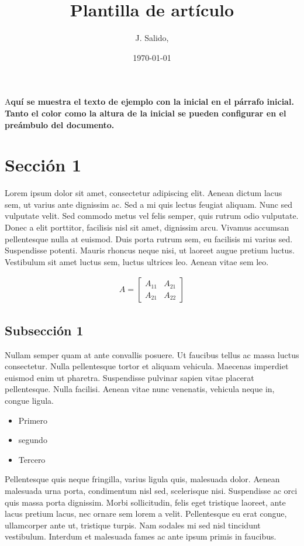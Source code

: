\documentclass[DIV=calc,paper=a4,fontsize=11pt,twocolumn]{scrartcl} %
\title{Plantilla de artículo}
\author{J. Salido, }
\date{\today} %
\newcommand{\inicial}[1]{ %
\lettrine[lines=3,lhang=0.3,nindent=0em]{
\color{DarkGoldenrod}
{\textsf{#1}}}{}}
\begin{document}
\maketitle

\thispagestyle{fancy}

%
%
\inicial{A}\textbf{quí se muestra el texto de ejemplo con la inicial en el párrafo inicial. Tanto el color como la altura de la inicial se pueden configurar en el preámbulo del documento.}




\section*{Sección 1}
Lorem ipsum dolor sit amet, consectetur adipiscing elit. Aenean dictum lacus sem, ut varius ante dignissim ac. Sed a mi quis lectus feugiat aliquam. Nunc sed vulputate velit. Sed commodo metus vel felis semper, quis rutrum odio vulputate. Donec a elit porttitor, facilisis nisl sit amet, dignissim arcu. Vivamus accumsan pellentesque nulla at euismod. Duis porta rutrum sem, eu facilisis mi varius sed. Suspendisse potenti. Mauris rhoncus neque nisi, ut laoreet augue pretium luctus. Vestibulum sit amet luctus sem, luctus ultrices leo. Aenean vitae sem leo.


\begin{align}
A = 
\begin{bmatrix}
A_{11} & A_{21} \\
A_{21} & A_{22}
\end{bmatrix}
\end{align}


\subsection*{Subsección 1}
Nullam semper quam at ante convallis posuere. Ut faucibus tellus ac massa luctus consectetur. Nulla pellentesque tortor et aliquam vehicula. Maecenas imperdiet euismod enim ut pharetra. Suspendisse pulvinar sapien vitae placerat pellentesque. Nulla facilisi. Aenean vitae nunc venenatis, vehicula neque in, congue ligula.

\begin{itemize}
\item Primero 
\item segundo 
\item Tercero
\end{itemize}

Pellentesque quis neque fringilla, varius ligula quis, malesuada dolor. Aenean malesuada urna porta, condimentum nisl sed, scelerisque nisi. Suspendisse ac orci quis massa porta dignissim. Morbi sollicitudin, felis eget tristique laoreet, ante lacus pretium lacus, nec ornare sem lorem a velit. Pellentesque eu erat congue, ullamcorper ante ut, tristique turpis. Nam sodales mi sed nisl tincidunt vestibulum. Interdum et malesuada fames ac ante ipsum primis in faucibus.
\end{document}
